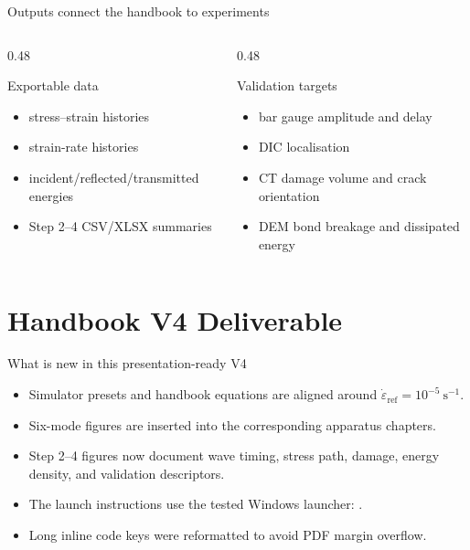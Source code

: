 \documentclass[11pt,aspectratio=169]{beamer}
\newcommand{\cmdline}[1]{{\scriptsize\ttfamily\detokenize{#1}}}
\begin{document}
\begin{frame}{Outputs connect the handbook to experiments}
  \begin{columns}[T,onlytextwidth]
    \begin{column}{0.48\textwidth}
      \begin{exampleblock}{Exportable data}
        \begin{itemize}
          \item stress--strain histories
          \item strain-rate histories
          \item incident/reflected/transmitted energies
          \item Step 2--4 CSV/XLSX summaries
        \end{itemize}
      \end{exampleblock}
    \end{column}
    \begin{column}{0.48\textwidth}
      \begin{block}{Validation targets}
        \begin{itemize}
          \item bar gauge amplitude and delay
          \item DIC localisation
          \item CT damage volume and crack orientation
          \item DEM bond breakage and dissipated energy
        \end{itemize}
      \end{block}
    \end{column}
  \end{columns}
\end{frame}

\section{Handbook V4 Deliverable}

\begin{frame}{What is new in this presentation-ready V4}
  \begin{itemize}
    \item Simulator presets and handbook equations are aligned around
          $\dot{\varepsilon}_{\mathrm{ref}}=10^{-5}\ \mathrm{s}^{-1}$.
    \item Six-mode figures are inserted into the corresponding apparatus
          chapters.
    \item Step 2--4 figures now document wave timing, stress path, damage,
          energy density, and validation descriptors.
    \item The launch instructions use the tested Windows launcher:
          \cmdline{py -3.13 -m streamlit}.
    \item Long inline code keys were reformatted to avoid PDF margin overflow.
  \end{itemize}
\end{frame}
\end{document}
